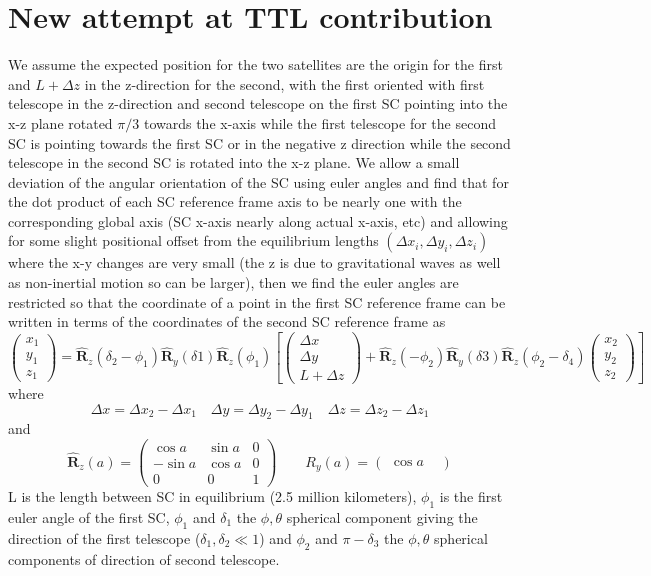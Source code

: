 \documentclass[11pt]{amsart}
\makeatletter
\newcommand{\op}[1]{\mathbf{\hat{#1}}}	%
\newcommand{\0}{\varnothing}		%
\newcommand{\1}{!}
\newcommand{\2}{@}
\newcommand{\3}{\#}
\newcommand{\4}{\$}
\newcommand{\5}{\%}
\newcommand{\6}{$^\wedge$}
\newcommand{\7}{\&}
\newcommand{\8}{*}
\newcommand{\9}{(}
\makeatother
\begin{document}
\section{New attempt at TTL contribution}
We assume the expected position for the two satellites are the origin for the first and $L+\Delta z$ in the z-direction for the second, with the first oriented with first telescope in the z-direction and second telescope on the first SC pointing into the x-z plane rotated $\pi/3$ towards the x-axis while the first telescope for the second SC is pointing towards the first SC or in the negative z direction while the second telescope in the second SC is rotated into the x-z plane. We allow a small deviation of the angular orientation of the SC using euler angles and find that for the dot product of each SC reference frame axis to be nearly one with the corresponding global axis (SC x-axis nearly along actual x-axis, etc) and allowing for some slight positional offset from the equilibrium lengths $\left(\Delta x_i,\Delta y_i,\Delta z_i\right)$ where the x-y changes are very small (the z is due to gravitational waves as well as non-inertial motion so can be larger), then we find the euler angles are restricted so that the coordinate of a point in the first SC reference frame can be written in terms of the coordinates of the second SC reference frame as
\[
\begin{pmatrix}
x_1\\y_1\\z_1
\end{pmatrix}
=\op{R}_z(\delta_2-\phi_1)\op{R}_y(\delta 1) \op{R}_z(\phi_1)\left[\begin{pmatrix}
\Delta x\\\Delta y\\ L+\Delta z
\end{pmatrix}
+\op{R}_z(-\phi_2)\op{R}_y(\delta 3) \op{R}_z(\phi_2-\delta_4)\begin{pmatrix}
x_2\\y_2\\z_2
\end{pmatrix}\right]
\]
where
\[
\Delta x = \Delta x_2 - \Delta x_1\quad\Delta y = \Delta y_2 - \Delta y_1\quad \Delta z = \Delta z_2 - \Delta z_1
\]
and 
\[
\op{R}_z(a) = \begin{pmatrix}
\cos a	&	\sin a	&	0
\\
-\sin a	&	\cos a	&	0
\\
0		&	0		&	1
\end{pmatrix}\qquad R_y(a) = \begin{pmatrix}
\cos a	&	 
\end{pmatrix}
\]
L is the length between SC in equilibrium (2.5 million kilometers), $\phi_1$ is the first euler angle of the first SC, $\phi_1$ and $\delta_1$ the $\phi,\theta$ spherical component giving the direction of the first telescope ($\delta_1,\delta_2\ll 1$) and $\phi_2$ and $\pi-\delta_3$ the $\phi,\theta$ spherical components of direction of second telescope.
\end{document}
